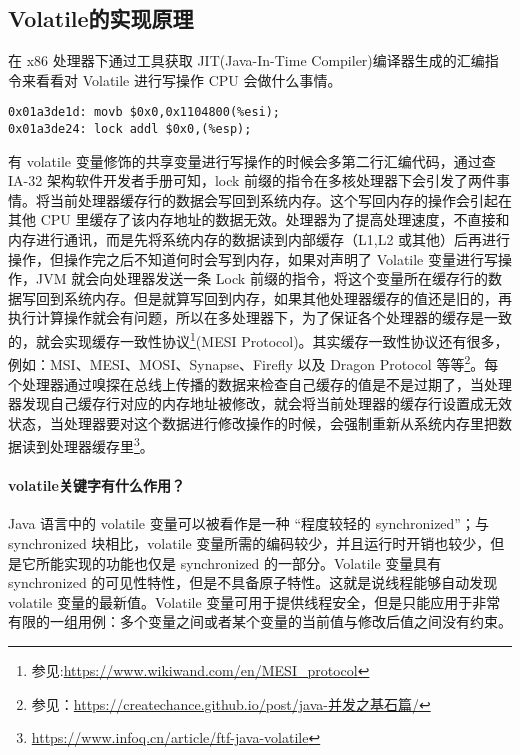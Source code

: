 \documentclass[../../../interview-questions.tex]{subfiles}
\begin{document}
\subsection{Volatile的实现原理}

在 x86 处理器下通过工具获取 JIT(Java-In-Time Compiler)编译器生成的汇编指令来看看对 Volatile 进行写操作 CPU 会做什么事情。

\begin{lstlisting}
0x01a3de1d: movb $0x0,0x1104800(%esi);
0x01a3de24: lock addl $0x0,(%esp);
\end{lstlisting}

有 volatile 变量修饰的共享变量进行写操作的时候会多第二行汇编代码，通过查 IA-32 架构软件开发者手册可知，lock 前缀的指令在多核处理器下会引发了两件事情。将当前处理器缓存行的数据会写回到系统内存。这个写回内存的操作会引起在其他 CPU 里缓存了该内存地址的数据无效。处理器为了提高处理速度，不直接和内存进行通讯，而是先将系统内存的数据读到内部缓存（L1,L2 或其他）后再进行操作，但操作完之后不知道何时会写到内存，如果对声明了 Volatile 变量进行写操作，JVM 就会向处理器发送一条 Lock 前缀的指令，将这个变量所在缓存行的数据写回到系统内存。但是就算写回到内存，如果其他处理器缓存的值还是旧的，再执行计算操作就会有问题，所以在多处理器下，为了保证各个处理器的缓存是一致的，就会实现缓存一致性协议\footnote{参见:\url{https://www.wikiwand.com/en/MESI_protocol}}(MESI Protocol)。其实缓存一致性协议还有很多，例如：MSI、MESI、MOSI、Synapse、Firefly 以及 Dragon Protocol 等等\footnote{参见：\url{https://createchance.github.io/post/java-并发之基石篇/}}。每个处理器通过嗅探在总线上传播的数据来检查自己缓存的值是不是过期了，当处理器发现自己缓存行对应的内存地址被修改，就会将当前处理器的缓存行设置成无效状态，当处理器要对这个数据进行修改操作的时候，会强制重新从系统内存里把数据读到处理器缓存里\footnote{\url{https://www.infoq.cn/article/ftf-java-volatile}}。

\paragraph{volatile关键字有什么作用？}

Java 语言中的 volatile 变量可以被看作是一种 “程度较轻的 synchronized”；与 synchronized 块相比，volatile 变量所需的编码较少，并且运行时开销也较少，但是它所能实现的功能也仅是 synchronized 的一部分。Volatile 变量具有 synchronized 的可见性特性，但是不具备原子特性。这就是说线程能够自动发现 volatile 变量的最新值。Volatile 变量可用于提供线程安全，但是只能应用于非常有限的一组用例：多个变量之间或者某个变量的当前值与修改后值之间没有约束。
\end{document}
